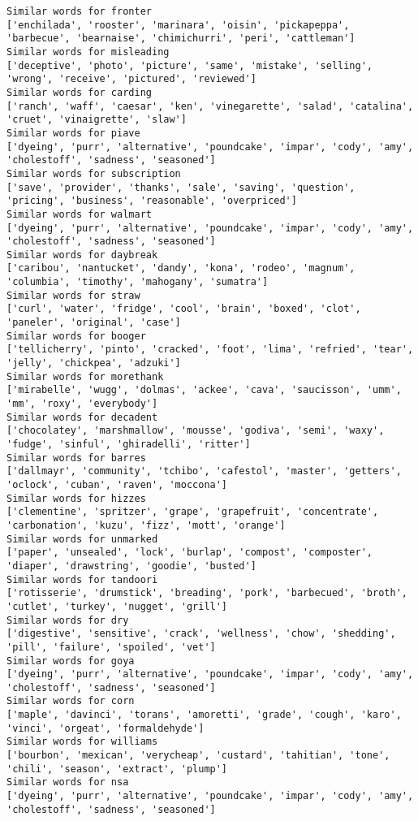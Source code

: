 \documentclass[11pt]{article}
\begin{document}
\begin{Verbatim}[commandchars=\\\{\}]
Similar words for fronter
['enchilada', 'rooster', 'marinara', 'oisin', 'pickapeppa', 'barbecue', 'bearnaise', 'chimichurri', 'peri', 'cattleman']
Similar words for misleading
['deceptive', 'photo', 'picture', 'same', 'mistake', 'selling', 'wrong', 'receive', 'pictured', 'reviewed']
Similar words for carding
['ranch', 'waff', 'caesar', 'ken', 'vinegarette', 'salad', 'catalina', 'cruet', 'vinaigrette', 'slaw']
Similar words for piave
['dyeing', 'purr', 'alternative', 'poundcake', 'impar', 'cody', 'amy', 'cholestoff', 'sadness', 'seasoned']
Similar words for subscription
['save', 'provider', 'thanks', 'sale', 'saving', 'question', 'pricing', 'business', 'reasonable', 'overpriced']
Similar words for walmart
['dyeing', 'purr', 'alternative', 'poundcake', 'impar', 'cody', 'amy', 'cholestoff', 'sadness', 'seasoned']
Similar words for daybreak
['caribou', 'nantucket', 'dandy', 'kona', 'rodeo', 'magnum', 'columbia', 'timothy', 'mahogany', 'sumatra']
Similar words for straw
['curl', 'water', 'fridge', 'cool', 'brain', 'boxed', 'clot', 'paneler', 'original', 'case']
Similar words for booger
['tellicherry', 'pinto', 'cracked', 'foot', 'lima', 'refried', 'tear', 'jelly', 'chickpea', 'adzuki']
Similar words for morethank
['mirabelle', 'wugg', 'dolmas', 'ackee', 'cava', 'saucisson', 'umm', 'mm', 'roxy', 'everybody']
Similar words for decadent
['chocolatey', 'marshmallow', 'mousse', 'godiva', 'semi', 'waxy', 'fudge', 'sinful', 'ghiradelli', 'ritter']
Similar words for barres
['dallmayr', 'community', 'tchibo', 'cafestol', 'master', 'getters', 'oclock', 'cuban', 'raven', 'moccona']
Similar words for hizzes
['clementine', 'spritzer', 'grape', 'grapefruit', 'concentrate', 'carbonation', 'kuzu', 'fizz', 'mott', 'orange']
Similar words for unmarked
['paper', 'unsealed', 'lock', 'burlap', 'compost', 'composter', 'diaper', 'drawstring', 'goodie', 'busted']
Similar words for tandoori
['rotisserie', 'drumstick', 'breading', 'pork', 'barbecued', 'broth', 'cutlet', 'turkey', 'nugget', 'grill']
Similar words for dry
['digestive', 'sensitive', 'crack', 'wellness', 'chow', 'shedding', 'pill', 'failure', 'spoiled', 'vet']
Similar words for goya
['dyeing', 'purr', 'alternative', 'poundcake', 'impar', 'cody', 'amy', 'cholestoff', 'sadness', 'seasoned']
Similar words for corn
['maple', 'davinci', 'torans', 'amoretti', 'grade', 'cough', 'karo', 'vinci', 'orgeat', 'formaldehyde']
Similar words for williams
['bourbon', 'mexican', 'verycheap', 'custard', 'tahitian', 'tone', 'chili', 'season', 'extract', 'plump']
Similar words for nsa
['dyeing', 'purr', 'alternative', 'poundcake', 'impar', 'cody', 'amy', 'cholestoff', 'sadness', 'seasoned']

\end{Verbatim}
\end{document}
